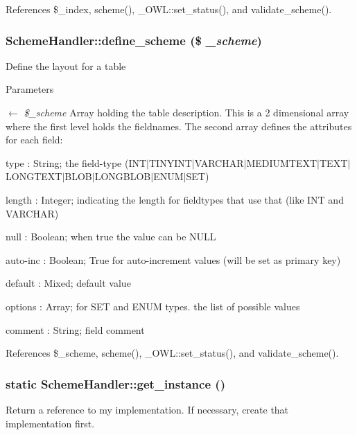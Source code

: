 References \$\_\-index, scheme(), \_\-OWL::set\_\-status(), and validate\_\-scheme().

\subsubsection[{define\_\-scheme}]{\setlength{\rightskip}{0pt plus 5cm}SchemeHandler::define\_\-scheme (\$ {\em \_\-scheme})}\label{classSchemeHandler_a07f6b7c5ac78e88f32584b90da53776b}
Define the layout for a table 
\begin{DoxyParams}{Parameters}
\item[\mbox{$\leftarrow$} {\em \$\_\-scheme}]Array holding the table description. This is a 2 dimensional array where the first level holds the fieldnames. The second array defines the attributes for each field:
\begin{DoxyItemize}
\item type : String; the field-\/type (INT$|$TINYINT$|$VARCHAR$|$MEDIUMTEXT$|$TEXT$|$LONGTEXT$|$BLOB$|$LONGBLOB$|$ENUM$|$SET)
\item length : Integer; indicating the length for fieldtypes that use that (like INT and VARCHAR)
\item null : Boolean; when true the value can be NULL
\item auto-\/inc : Boolean; True for auto-\/increment values (will be set as primary key)
\item default : Mixed; default value
\item options : Array; for SET and ENUM types. the list of possible values
\item comment : String; field comment 
\end{DoxyItemize}\end{DoxyParams}


References \$\_\-scheme, scheme(), \_\-OWL::set\_\-status(), and validate\_\-scheme().

\subsubsection[{get\_\-instance}]{\setlength{\rightskip}{0pt plus 5cm}static SchemeHandler::get\_\-instance ()}\label{classSchemeHandler_a02edff8af08e3e33a7571e2da8f98cc7}
Return a reference to my implementation. If necessary, create that implementation first.

